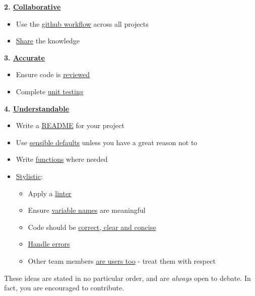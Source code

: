 \documentclass[]{book}
\providecommand{\tightlist}{%
  \setlength{\itemsep}{0pt}\setlength{\parskip}{0pt}}
\begin{document}
\textbf{2. \protect\hyperlink{collaborate}{Collaborative}}

\begin{itemize}
\tightlist
\item
  Use the \protect\hyperlink{versioncontrol}{github workflow} across all projects\\
\item
  \protect\hyperlink{knowledge}{Share} the knowledge
\end{itemize}

\textbf{3. \protect\hyperlink{accurate}{Accurate}}

\begin{itemize}
\tightlist
\item
  Ensure code is \protect\hyperlink{review}{reviewed}
\item
  Complete \protect\hyperlink{unittest}{unit testing}
\end{itemize}

\textbf{4. \protect\hyperlink{understand}{Understandable}}

\begin{itemize}
\tightlist
\item
  Write a \protect\hyperlink{readme}{README} for your project\\
\item
  Use \protect\hyperlink{defaults}{sensible defaults} unless you have a great reason not to
\item
  Write \protect\hyperlink{functions}{functions} where needed\\
\item
  \protect\hyperlink{style}{Stylistic}:

  \begin{itemize}
  \tightlist
  \item
    Apply a \protect\hyperlink{linter}{linter}
  \item
    Ensure \protect\hyperlink{names}{variable names} are meaningful
  \item
    Code should be \protect\hyperlink{ccc}{correct, clear and concise}
  \item
    \protect\hyperlink{errors}{Handle errors}\\
  \item
    Other team members \protect\hyperlink{users}{are users too} - treat them with respect
  \end{itemize}
\end{itemize}

These ideas are stated in no particular order, and are \emph{always} open to debate. In fact, you are encouraged to contribute.
\end{document}
